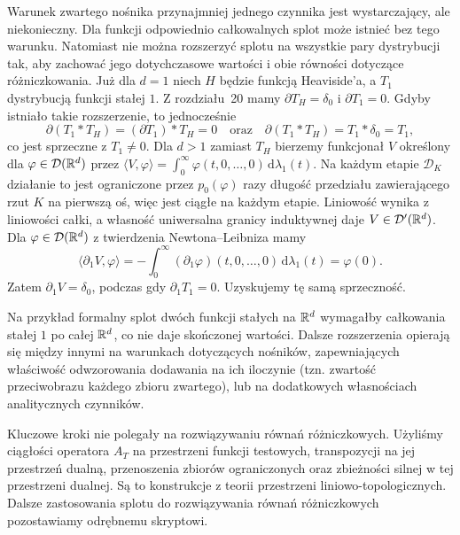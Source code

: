 \begin{uwaga}
\label{rem:convolution-limits21}
Warunek zwartego nośnika przynajmniej jednego
czynnika jest wystarczający, ale niekonieczny.
Dla funkcji odpowiednio całkowalnych splot może istnieć
bez tego warunku. Natomiast nie można rozszerzyć splotu na wszystkie pary
dystrybucji tak, aby zachować jego dotychczasowe wartości
i obie równości dotyczące różniczkowania.
Już dla $d=1$ niech $H$ będzie funkcją Heaviside'a,
a $T_1$ dystrybucją funkcji stałej $1$.
Z rozdziału~20 mamy $\partial T_H=\delta_0$ i
$\partial T_1=0$. Gdyby istniało takie rozszerzenie,
to jednocześnie
\[
 \partial(T_1*T_H)=(\partial T_1)*T_H=0
 \quad\text{oraz}\quad
 \partial(T_1*T_H)=T_1*\delta_0=T_1,
\]
co jest sprzeczne z $T_1\ne0$.
Dla $d>1$ zamiast $T_H$ bierzemy funkcjonał $V$
określony dla $\varphi\in\mathcal D(\mathbb R^d)$ przez
$\langle V,\varphi\rangle=\int_0^\infty
\varphi(t,0,\ldots,0)\,\mathrm d\lambda_1(t)$.
Na każdym etapie $\mathcal D_K$ działanie to jest
ograniczone przez $p_0(\varphi)$ razy długość
przedziału zawierającego rzut $K$ na pierwszą oś,
więc jest ciągłe na każdym etapie. Liniowość wynika z
liniowości całki, a własność uniwersalna granicy induktywnej
daje $V\in\mathcal D'(\mathbb R^d)$. Dla $\varphi\in\mathcal D(\mathbb R^d)$
z twierdzenia Newtona--Leibniza mamy
\[
 \langle\partial_1V,\varphi\rangle
 =-\int_0^\infty(\partial_1\varphi)(t,0,\ldots,0)
 \,\mathrm d\lambda_1(t)=\varphi(0).
\]
Zatem $\partial_1 V=\delta_0$, podczas gdy
$\partial_1 T_1=0$. Uzyskujemy tę samą sprzeczność.

Na przykład formalny splot dwóch funkcji stałych
na $\mathbb R^d$ wymagałby całkowania stałej $1$
po całej $\mathbb R^d$, co nie daje skończonej wartości.
Dalsze rozszerzenia opierają się między innymi
na warunkach dotyczących nośników, zapewniających
właściwość odwzorowania dodawania na ich iloczynie
(tzn. zwartość przeciwobrazu każdego zbioru zwartego),
lub na dodatkowych własnościach analitycznych czynników.
\end{uwaga}

\begin{uwaga}
\label{rem:convolution-tvs21}
Kluczowe kroki nie polegały na rozwiązywaniu równań
różniczkowych. Użyliśmy ciągłości operatora
$A_T$ na przestrzeni funkcji testowych, transpozycji
na jej przestrzeń dualną, przenoszenia zbiorów ograniczonych
oraz zbieżności silnej w tej przestrzeni dualnej.
Są to konstrukcje z teorii przestrzeni liniowo-topologicznych.
Dalsze zastosowania splotu do rozwiązywania równań
różniczkowych pozostawiamy odrębnemu skryptowi.
\end{uwaga}

